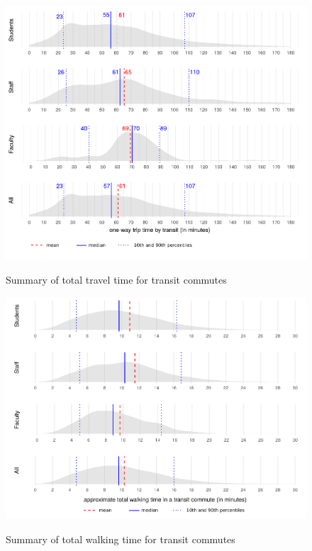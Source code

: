 \documentclass{article}
\begin{document}
		\begin{figure}[H]
			\caption{Summary of total travel time for transit commutes}
			\centering
			
			\hspace*{-23mm}
			\includegraphics[width=6.5in]{figures/o_duration}
			\label{fig:o_durations}
		\end{figure}
	
	
		\begin{figure}[H]
			\caption{Summary of total walking time for transit commutes}
			\centering
			
			\hspace*{-23mm}
			\includegraphics[width=6.5in]{figures/o_walk}
			\label{fig:o_walk}
		\end{figure}
	
\end{document}

